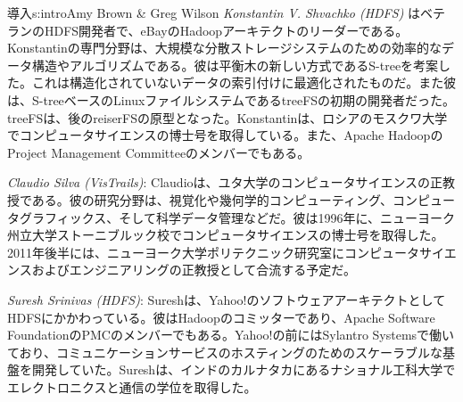 \begin{aosachapter}{導入}{s:intro}{Amy Brown \& Greg Wilson}
\emph{Konstantin V. Shvachko (HDFS)} はベテランのHDFS開発者で、eBayのHadoopアーキテクトのリーダーである。Konstantinの専門分野は、大規模な分散ストレージシステムのための効率的なデータ構造やアルゴリズムである。彼は平衡木の新しい方式であるS-treeを考案した。これは構造化されていないデータの索引付けに最適化されたものだ。また彼は、S-treeベースのLinuxファイルシステムであるtreeFSの初期の開発者だった。treeFSは、後のreiserFSの原型となった。Konstantinは、ロシアのモスクワ大学でコンピュータサイエンスの博士号を取得している。また、Apache HadoopのProject Management Committeeのメンバーでもある。

\emph{Claudio Silva (VisTrails)}: Claudioは、ユタ大学のコンピュータサイエンスの正教授である。彼の研究分野は、視覚化や幾何学的コンピューティング、コンピュータグラフィックス、そして科学データ管理などだ。彼は1996年に、ニューヨーク州立大学ストーニブルック校でコンピュータサイエンスの博士号を取得した。2011年後半には、ニューヨーク大学ポリテクニック研究室にコンピュータサイエンスおよびエンジニアリングの正教授として合流する予定だ。

\emph{Suresh Srinivas (HDFS)}: Sureshは、Yahoo!のソフトウェアアーキテクトとしてHDFSにかかわっている。彼はHadoopのコミッターであり、Apache Software FoundationのPMCのメンバーでもある。Yahoo!の前にはSylantro Systemsで働いており、コミュニケーションサービスのホスティングのためのスケーラブルな基盤を開発していた。Sureshは、インドのカルナタカにあるナショナル工科大学でエレクトロニクスと通信の学位を取得した。


\end{aosachapter}
